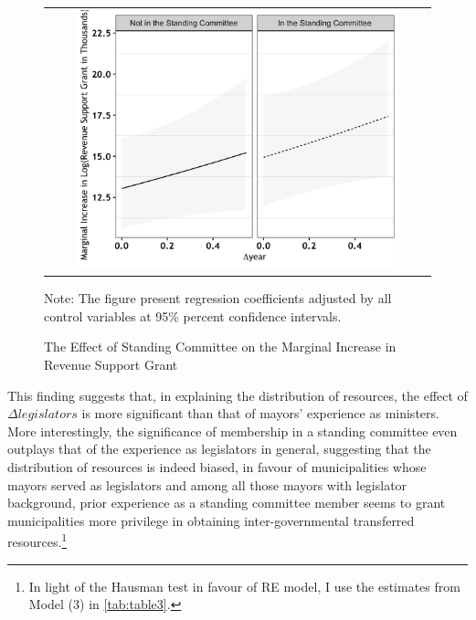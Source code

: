 \begin{figure}[!htbp]
\begin{singlespace}
\begin{centering}
\caption{The Effect of Standing Committee on the Marginal Increase in \\ Revenue Support Grant \label{fig:figure6}}
\par\end{centering}
\end{singlespace}
\begin{centering}
\begin{tabular}{c}
\includegraphics[width=12cm,height=7.5cm]{04-Chapter-Four/image/figure6.jpeg}\tabularnewline
\end{tabular}
\par\end{centering}
Note: The figure present regression coefficients adjusted by all control variables at 95\% percent confidence intervals.
\end{figure}
\textcolor{black}{{} }


This finding suggests that, in explaining the distribution of resources, the effect of $\Delta\ensuremath{legislators}$ is more significant than that of mayors' experience as ministers. More interestingly, the significance of membership in a standing committee even outplays that of the experience as legislators in general, suggesting that the distribution of resources is indeed biased, in favour of municipalities whose mayors served as legislators and among all those mayors with legislator background, prior experience as a standing committee member seems to grant municipalities more privilege in obtaining inter-governmental transferred resources.\footnote{In light of the Hausman test in favour of RE model, I use the estimates from Model (3) in \autoref{tab:table3}.} 

